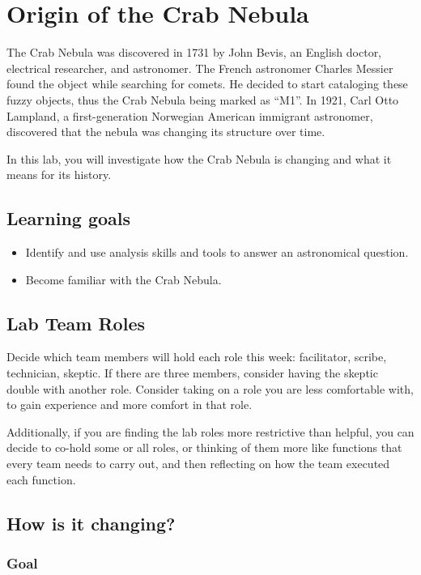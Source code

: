 \chapter{Origin of the Crab Nebula}

The Crab Nebula was discovered in 1731 by John Bevis, an English doctor, electrical researcher, and astronomer. The French astronomer Charles Messier found the object while searching for comets. He decided to start cataloging these fuzzy objects, thus the Crab Nebula being marked as ``M1''. In 1921, Carl Otto Lampland, a first-generation Norwegian American immigrant astronomer, discovered that the nebula was changing its structure over time.

In this lab, you will investigate how the Crab Nebula is changing and what it means for its history.

\section{Learning goals}

\begin{itemize}
	\item Identify and use analysis skills and tools to answer an astronomical question.
	
	\item Become familiar with the Crab Nebula.
\end{itemize}

\section{Lab Team Roles}

Decide which team members will hold each role this week: facilitator, scribe, technician, skeptic. If there are three members, consider having the skeptic double with another role. Consider taking on a role you are less comfortable with, to gain experience and more comfort in that role.

Additionally, if you are finding the lab roles more restrictive than helpful, you can decide to co-hold some or all roles, or thinking of them more like functions that every team needs to carry out, and then reflecting on how the team executed each function.

\section{How is it changing?}

\subsection{Goal}

